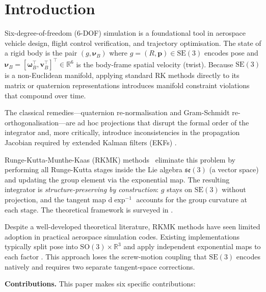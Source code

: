 \documentclass[a4paper,10pt]{article}
\newcommand{\SO}{\mathrm{SO}(3)}
\newcommand{\SE}{\mathrm{SE}(3)}
\newcommand{\se}{\mathfrak{se}(3)}
\newcommand{\dexp}{\mathrm{d}\exp}
\newcommand{\R}{\mathbb{R}}
\newcommand{\nuB}{\boldsymbol{\nu}_B}
\newcommand{\omB}{\boldsymbol{\omega}_B}
\newcommand{\vB}{\mathbf{v}_B}
\theoremstyle{definition}
\begin{document}
\vspace{6pt}

\section{Introduction}

Six-degree-of-freedom (6-DOF) simulation is a foundational tool in aerospace
vehicle design, flight control verification, and trajectory optimisation.  The
state of a rigid body is the pair $(g, \nuB)$ where $g = (R, \mathbf{p}) \in \SE$
encodes pose and $\nuB = [\omB^\top, \vB^\top]^\top \in \R^6$ is the body-frame
spatial velocity (twist).  Because $\SE$ is a non-Euclidean manifold, applying
standard RK methods directly to its matrix or quaternion representations
introduces manifold constraint violations that compound over time.

The classical remedies---quaternion re-normalisation and Gram-Schmidt
re-orthogonalisation---are ad hoc projections that disrupt the formal order of
the integrator and, more critically, introduce inconsistencies in the
propagation Jacobian required by extended Kalman filters (EKFs)
\citep{barfoot2017stateEstimation}.

Runge-Kutta-Munthe-Kaas (RKMK) methods~\citep{muntheKaas1998, iserles2000liegroup}
eliminate this problem by performing all Runge-Kutta stages inside the Lie
algebra $\se$ (a vector space) and updating the group element via the
exponential map.  The resulting integrator is \emph{structure-preserving by
construction}: $g$ stays on $\SE$ without projection, and the tangent map
$\dexp^{-1}$ accounts for the group curvature at each stage.  The theoretical
framework is surveyed in \citet{hairerLubichWanner2006gni}.

Despite a well-developed theoretical literature, RKMK methods have seen
limited adoption in practical aerospace simulation codes.  Existing
implementations typically split pose into $\SO \times \R^3$ and apply
independent exponential maps to each factor \citep{stevens2016aircraft}.
This approach loses the screw-motion coupling that $\SE$ encodes natively and
requires two separate tangent-space corrections.

\textbf{Contributions.}  This paper makes six specific contributions:
\end{document}
